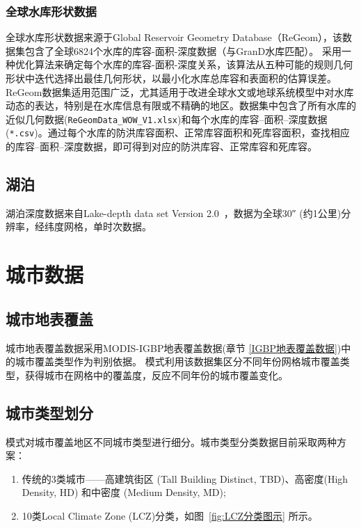 \subsubsection{全球水库形状数据}

全球水库形状数据来源于Global Reservoir Geometry Database（ReGeom），该数据集包含了全球6824个水库的库容-面积-深度数据（与GranD水库匹配）。\citet{yigzaw2018new} 采用一种优化算法来确定每个水库的库容-面积-深度关系，该算法从五种可能的规则几何形状中迭代选择出最佳几何形状，以最小化水库总库容和表面积的估算误差。ReGeom数据集适用范围广泛，尤其适用于改进全球水文或地球系统模型中对水库动态的表达，特别是在水库信息有限或不精确的地区。数据集中包含了所有水库的近似几何数据(\texttt{ReGeomData\_WOW\_V1.xlsx})和每个水库的库容--面积--深度数据(\texttt{*.csv})。通过每个水库的防洪库容面积、正常库容面积和死库容面积，查找相应的库容--面积--深度数据，即可得到对应的防洪库容、正常库容和死库容。


\subsection{湖泊}
湖泊深度数据来自Lake-depth data set Version 2.0~\citep{kourzeneva2012global}，数据为全球\ang{;;30} (约1公里)分辨率，经纬度网格，单时次数据。


\section{城市数据}\label{城市数据}

\subsection{城市地表覆盖}\label{城市地表覆盖}
城市地表覆盖数据采用MODIS-IGBP地表覆盖数据(章节 \ref{IGBP地表覆盖数据})中的城市覆盖类型作为判别依据。
模式利用该数据集区分不同年份网格城市覆盖类型，获得城市在网格中的覆盖度，反应不同年份的城市覆盖变化。


\subsection{城市类型划分}\label{城市类型划分}
模式对城市覆盖地区不同城市类型进行细分。城市类型分类数据目前采取两种方案：
\begin{enumerate}
    \item 传统的3类城市——高建筑街区 (Tall Building Distinct, TBD)、高密度(High Density, HD) 和中密度 (Medium Density, MD);
    \item 10类Local Climate Zone (LCZ)分类，如图~\ref{fig:LCZ分类图示}  所示。
\end{enumerate}


